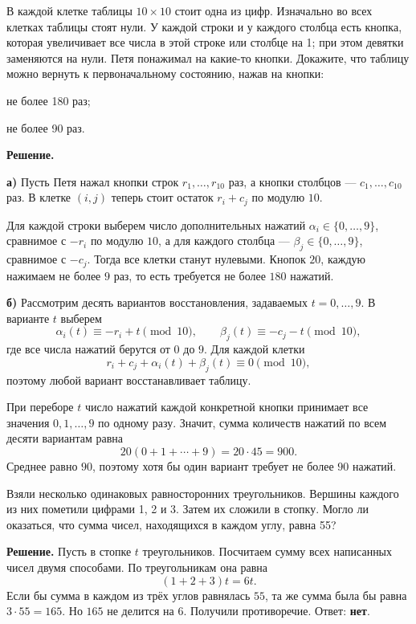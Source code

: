\begin{problems}
\item В каждой клетке таблицы $10\times10$ стоит одна из цифр. Изначально во всех клетках таблицы стоят нули. У каждой строки и у каждого столбца есть кнопка, которая увеличивает все числа в этой строке или столбце на 1; при этом девятки заменяются на нули. Петя понажимал на какие-то кнопки. Докажите, что таблицу можно вернуть к первоначальному состоянию, нажав на кнопки:
\begin{parts}
  \item не более 180 раз;
  \item не более 90 раз.
\end{parts}
\par\smallskip\noindent\textbf{Решение.} \par\textbf{а)} Пусть Петя нажал кнопки строк $r_1,\ldots,r_{10}$ раз, а кнопки столбцов --- $c_1,\ldots,c_{10}$ раз. В клетке $(i,j)$ теперь стоит остаток $r_i+c_j$ по модулю $10$.
\par Для каждой строки выберем число дополнительных нажатий $\alpha_i\in\{0,\ldots,9\}$, сравнимое с $-r_i$ по модулю $10$, а для каждого столбца --- $\beta_j\in\{0,\ldots,9\}$, сравнимое с $-c_j$. Тогда все клетки станут нулевыми. Кнопок $20$, каждую нажимаем не более $9$ раз, то есть требуется не более $180$ нажатий.
\par\textbf{б)} Рассмотрим десять вариантов восстановления, задаваемых $t=0,\ldots,9$. В варианте $t$ выберем
\[
\alpha_i(t)\equiv-r_i+t\pmod{10},
\qquad
\beta_j(t)\equiv-c_j-t\pmod{10},
\]
где все числа нажатий берутся от $0$ до $9$. Для каждой клетки
\[
r_i+c_j+\alpha_i(t)+\beta_j(t)\equiv0\pmod{10},
\]
поэтому любой вариант восстанавливает таблицу.
\par При переборе $t$ число нажатий каждой конкретной кнопки принимает все значения $0,1,\ldots,9$ по одному разу. Значит, сумма количеств нажатий по всем десяти вариантам равна
\[
20(0+1+\cdots+9)=20\cdot45=900.
\]
Среднее равно $90$, поэтому хотя бы один вариант требует не более $90$ нажатий.\par

\item Взяли несколько одинаковых равносторонних треугольников. Вершины каждого из них пометили цифрами 1, 2 и 3. Затем их сложили в стопку. Могло ли оказаться, что сумма чисел, находящихся в каждом углу, равна 55?
\par\smallskip\noindent\textbf{Решение.} Пусть в стопке $t$ треугольников. Посчитаем сумму всех написанных чисел двумя способами. По треугольникам она равна
\[
(1+2+3)t=6t.
\]
Если бы сумма в каждом из трёх углов равнялась $55$, та же сумма была бы равна $3\cdot55=165$. Но $165$ не делится на $6$. Получили противоречие. Ответ: \textbf{нет}.\par


\end{problems}
